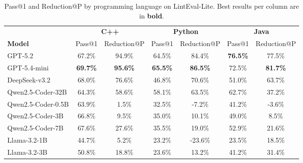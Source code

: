 \begin{table}[t]
\centering
\small
\begin{adjustbox}{max width=\textwidth}
\begin{tabular}{lcccccc}
\toprule
& \multicolumn{2}{c}{\textbf{C++}} & \multicolumn{2}{c}{\textbf{Python}} & \multicolumn{2}{c}{\textbf{Java}} \\
\cmidrule(lr){2-3} \cmidrule(lr){4-5} \cmidrule(lr){6-7}
\textbf{Model} & Pass@1 & Reduction@P & Pass@1 & Reduction@P & Pass@1 & Reduction@P \\
\midrule
GPT-5.2 & 67.2\% & 94.9\% & 64.5\% & 84.4\% & \textbf{76.5\%} & 77.5\% \\
GPT-5.4-mini & \textbf{69.7\%} & \textbf{95.6\%} & \textbf{65.5\%} & \textbf{86.5\%} & 72.5\% & \textbf{81.7\%} \\
\midrule
DeepSeek-v3.2 & 68.0\% & 76.6\% & 46.8\% & 70.6\% & 51.0\% & 63.7\% \\
Qwen2.5-Coder-32B & 64.3\% & 58.6\% & 58.1\% & 63.5\% & 62.7\% & 37.2\% \\
Qwen2.5-Coder-0.5B & 63.9\% & 1.5\% & 32.5\% & -7.2\% & 41.2\% & -3.6\% \\
Qwen2.5-Coder-3B & 66.8\% & 9.5\% & 35.0\% & 10.1\% & 49.0\% & 8.5\% \\
Qwen2.5-Coder-7B & 67.6\% & 27.6\% & 35.5\% & 19.0\% & 52.9\% & 21.6\% \\
Llama-3.2-1B & 44.7\% & 5.2\% & 23.2\% & -23.6\% & 23.5\% & 18.5\% \\
Llama-3.2-3B & 50.8\% & 18.8\% & 23.6\% & 13.2\% & 41.2\% & 31.4\% \\
\bottomrule
\end{tabular}
\end{adjustbox}
\caption{Pass@1 and Reduction@P by programming language on LintEval-Lite. Best results per column are in \textbf{bold}.}
\label{tab:language_performance}
\end{table}